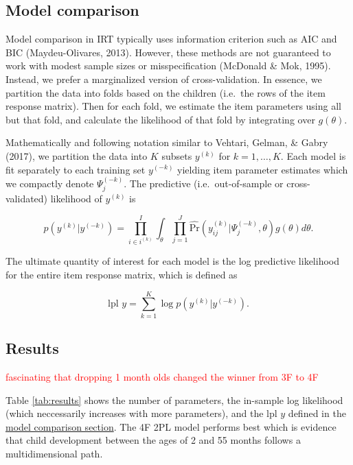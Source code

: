 \documentclass[10pt, letterpaper]{article}
\begin{document}
\hypertarget{modelcompare}{%
\subsection{Model comparison}\label{modelcompare}}

Model comparison in IRT typically uses information criterion such as AIC
and BIC (Maydeu-Olivares, 2013). However, these methods are not
guaranteed to work with modest sample sizes or misspecification
(McDonald \& Mok, 1995). Instead, we prefer a marginalized version of
cross-validation. In essence, we partition the data into folds based on
the children (i.e.~the rows of the item response matrix). Then for each
fold, we estimate the item parameters using all but that fold, and
calculate the likelihood of that fold by integrating over \(g(\theta)\).

Mathematically and following notation similar to Vehtari, Gelman, \&
Gabry (2017), we partition the data into \(K\) subsets \(y^{(k)}\) for
\(k = 1, \dots, K\). Each model is fit separately to each training set
\(y^{(-k)}\) yielding item parameter estimates which we compactly denote
\(\Psi_j^{(-k)}\). The predictive (i.e.~out-of-sample or
cross-validated) likelihood of \(y^{(k)}\) is

\[
p(y^{(k)} | y^{(-k)}) = \prod_{i \in i^{(k)}}^{I} \int_\theta \prod_{j=1}^{J} \hat{\text{Pr}}(y_{ij}^{(k)} | \Psi_j^{(-k)}, \theta) g(\theta)d\theta.
\]

The ultimate quantity of interest for each model is the log predictive
likelihood for the entire item response matrix, which is defined as

\[
\text{lpl } y = \sum_{k = 1}^{K} \log p(y^{(k)} | y^{(-k)}).
\]

\hypertarget{results}{%
\subsection{Results}\label{results}}

\textcolor{red}{fascinating that dropping 1 month olds}
\textcolor{red}{changed the winner from 3F to 4F}

Table \ref{tab:results} shows the number of parameters, the in-sample
log likelihood (which neccessarily increases with more parameters), and
the \(\text{lpl } y\) defined in the
\protect\hyperlink{modelcompare}{model comparison section}. The 4F 2PL
model performs best which is evidence that child development between the
ages of 2 and 55 months follows a multidimensional path.
\end{document}
